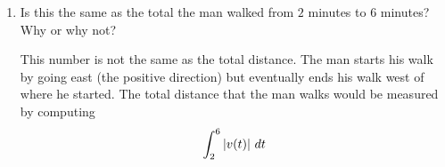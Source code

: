 \documentclass[nooutcomes]{ximera}
\begin{document}
\begin{problem}
\begin{enumerate}
		
		
	\item  Is this the same as the total  the man walked from $2$ minutes to $6$ minutes?  Why or why not?
		\begin{freeResponse}
		This number is not the same as the total distance.  The man starts his walk by going east (the positive direction) but eventually ends his walk west of where he started.  
		The total distance that the man walks would be measured by computing 
		$$\int_2^6 \left| v(t) \right| \,d t$$  
		\end{freeResponse}
		
		
		
	\end{enumerate}
		
		
		

		
		
		

\end{problem}
	
	
	
	
	
	
	
	
			
			
\end{document}
